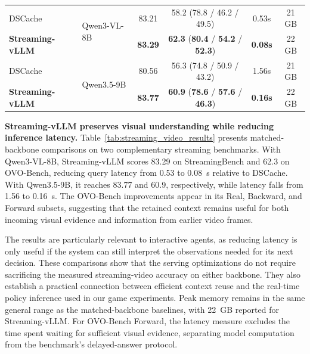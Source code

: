\begin{table}[t]
{\begin{tabular}{llcccc}
            \midrule

            DSCache~\cite{pang2026dscache}
            & \multirow{2}{*}{Qwen3-VL-8B}
            & 83.21
            & 58.2 (78.8 / 46.2 / 49.5)
            & 0.53s
            & 21 GB \\

            \textbf{Streaming-vLLM}
            &
            & \textbf{83.29}
            & \textbf{62.3} (\textbf{80.4} / \textbf{54.2} / \textbf{52.3})
            & \textbf{0.08s}
            & 22 GB \\

            \midrule

            DSCache~\cite{pang2026dscache}
            & \multirow{2}{*}{Qwen3.5-9B}
            & 80.56
            & 56.3 (74.8 / 50.9 / 43.2)
            & 1.56s
            & 21 GB \\

            \textbf{Streaming-vLLM}
            &
            & \textbf{83.77}
            & \textbf{60.9} (\textbf{78.6} / \textbf{57.6} / \textbf{46.3})
            & \textbf{0.16s}
            & 22 GB \\
            
            \bottomrule
        \end{tabular}%
    }
\end{table}




\textbf{Streaming-vLLM preserves visual understanding while reducing inference latency.}
Table~\ref{tab:streaming_video_results} presents matched-backbone comparisons on two complementary streaming benchmarks. With Qwen3-VL-8B, Streaming-vLLM scores 83.29 on StreamingBench and 62.3 on OVO-Bench, reducing query latency from 0.53 to 0.08~s relative to DSCache. With Qwen3.5-9B, it reaches 83.77 and 60.9, respectively, while latency falls from 1.56 to 0.16~s. The OVO-Bench improvements appear in its Real, Backward, and Forward subsets, suggesting that the retained context remains useful for both incoming visual evidence and information from earlier video frames.

The results are particularly relevant to interactive agents, as reducing latency is only useful if the system can still interpret the observations needed for its next decision. These comparisons show that the serving optimizations do not require sacrificing the measured streaming-video accuracy on either backbone. They also establish a practical connection between efficient context reuse and the real-time policy inference used in our game experiments. Peak memory remains in the same general range as the matched-backbone baselines, with 22~GB reported for Streaming-vLLM. For OVO-Bench Forward, the latency measure excludes the time spent waiting for sufficient visual evidence, separating model computation from the benchmark's delayed-answer protocol.


